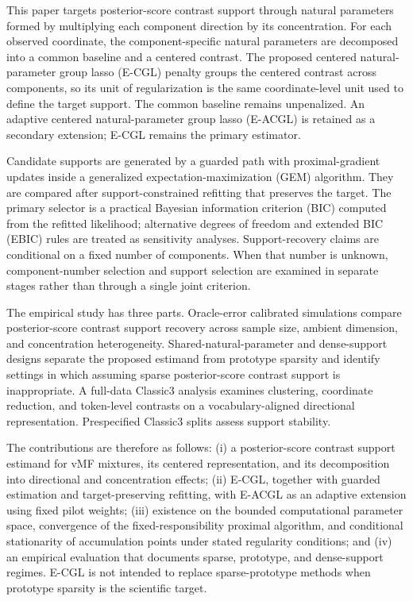\documentclass[preprint,12pt,authoryear]{elsarticle}
\newcounter{algorithm}
\begin{document}
This paper targets posterior-score contrast support through natural parameters
formed by multiplying each component direction by its concentration. For each
observed coordinate, the component-specific natural parameters are decomposed
into a common baseline and a centered contrast. The proposed centered
natural-parameter group lasso (E-CGL) penalty
groups the centered contrast across components, so its unit of regularization
is the same coordinate-level unit used to define the target support. The common
baseline remains unpenalized. An adaptive centered natural-parameter group
lasso (E-ACGL) is retained as a secondary extension; E-CGL remains the primary
estimator.

Candidate supports are generated by a guarded path with proximal-gradient
updates inside a generalized expectation-maximization (GEM) algorithm. They
are compared after support-constrained
refitting that preserves the target.
The primary selector is a practical Bayesian information criterion (BIC)
computed from the refitted likelihood; alternative degrees of freedom and
extended BIC (EBIC) rules are treated as sensitivity
analyses. Support-recovery claims are conditional on a fixed number of components.
When that number is unknown, component-number selection and support selection
are examined in separate stages rather than through a single joint criterion.

The empirical study has three parts. Oracle-error calibrated simulations
compare posterior-score contrast support recovery across sample size, ambient
dimension, and concentration heterogeneity. Shared-natural-parameter and
dense-support designs separate the proposed estimand from prototype sparsity
and identify settings in which assuming sparse posterior-score contrast
support is inappropriate. A full-data Classic3
analysis examines clustering, coordinate reduction, and token-level contrasts
on a vocabulary-aligned directional representation. Prespecified Classic3
splits assess support stability.

The contributions are therefore as follows: (i) a posterior-score contrast support
estimand for vMF mixtures, its centered representation, and its decomposition
into directional and concentration effects; (ii) E-CGL, together with guarded
estimation and target-preserving refitting, with E-ACGL as an adaptive
extension using fixed pilot weights;
(iii) existence on the bounded computational parameter space, convergence of
the fixed-responsibility proximal algorithm, and conditional stationarity of
accumulation points under stated regularity conditions; and
(iv) an empirical evaluation that documents sparse, prototype, and
dense-support regimes.
E-CGL is not intended to replace sparse-prototype methods when prototype
sparsity is the scientific target.
\end{document}
